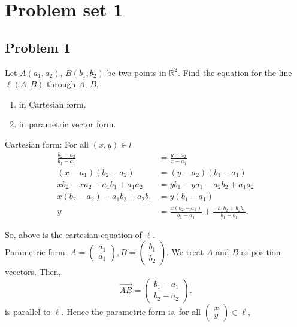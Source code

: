 \section{Problem set 1}

\subsection{Problem 1}
  Let \( A(a_{1},a_{2}) \), \( B(b_{1},b_{2}) \) be two points in \( \mathbb{R}^{2} \). Find
  the equation for the line \( \ell(A,B) \) through \( A \), \( B \).
  \begin{enumerate}
    \item in Cartesian form.
    \item in parametric vector form.
  \end{enumerate}

\begin{solution}
 Cartesian form:
 For all \( \left(x,y  \right) \in l \) 
 \begin{align*}
    \frac{b_{2}-a_{2}}{b_{1}-a_{1}} &= \frac{y-a_{2}}{x-a_{1}} \\
    \left( x-a_{1} \right) \left( b_{2}-a_{2} \right) &= \left( y-a_{2} \right) \left( b_{1} - a_{1} \right)     \\
    xb_{2} - xa_{2} - a_{1}b_{1} + a_{1}a_{2} &= yb_{1} - ya_{1} -a_{2}b_{2} + a_{1}a_{2} \\
    x(b_{2}-a_{2}) - a_{1}b_{2} + a_{2}b_{1} &= y \left( b_{1}-a_{1} \right) \\
                                             y &= \frac{x \left( b_{2}-a_{1} \right)}{b_{1}-a_{1}} + \frac{-a_{1}b_{2}+b_{2}b_{1}}{b_{1}-b_{1}} 
  .\end{align*}
 \end{solution}

 So, above is the cartesian equation of \( \ell \). \\
 
 Parametric form: \( A = \begin{pmatrix} a_{1} \\ a_{1} \end{pmatrix}, B = \begin{pmatrix} b_{1} \\ b_{2} \end{pmatrix}  \). We treat
\( A \) and \( B \) as position veectors. Then,
\[
  \overrightarrow{AB} = \begin{pmatrix} b_{1}-a_{1} \\b_{2}-a_{2} \end{pmatrix} 
.\] 
is parallel to \( \ell \). Hence the parametric form is, for all \( \begin{pmatrix} x \\ y \end{pmatrix} \in \ell \),

